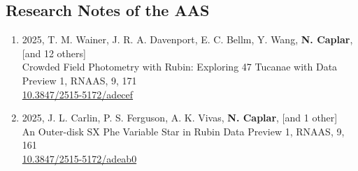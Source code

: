 \documentclass[11pt,letterpaper]{article}
\begin{document}
\subsection*{Research Notes of the AAS}
\begin{enumerate}

\item 2025, T. M. Wainer, J. R. A. Davenport, E. C. Bellm, Y. Wang, \textbf{N. Caplar}, [and 12 others] \\
Crowded Field Photometry with Rubin: Exploring 47 Tucanae with Data Preview 1, RNAAS, 9, 171 \\
\href{https://ui.adsabs.harvard.edu/link_gateway/2025RNAAS...9..171W/doi:10.3847/2515-5172/adecef}{10.3847/2515-5172/adecef} \\

\item 2025, J. L. Carlin, P. S. Ferguson, A. K. Vivas, \textbf{N. Caplar}, [and 1 other] \\
An Outer-disk SX Phe Variable Star in Rubin Data Preview 1, RNAAS, 9, 161 \\
\href{https://ui.adsabs.harvard.edu/link_gateway/2025RNAAS...9..161C/doi:10.3847/2515-5172/adeab0}{10.3847/2515-5172/adeab0} \\

\end{enumerate}
\end{document}
